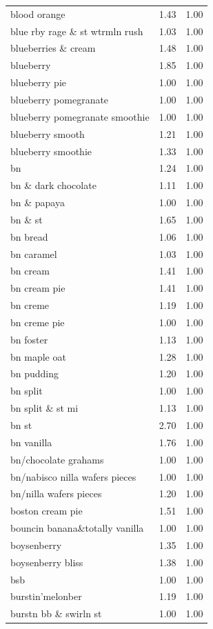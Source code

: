 \begin{table}
\begin{tabular}{lrr}
blood orange & 1.43 & 1.00 \\
blue rby rage \& st wtrmln rush & 1.03 & 1.00 \\
blueberries \& cream & 1.48 & 1.00 \\
blueberry & 1.85 & 1.00 \\
blueberry pie & 1.00 & 1.00 \\
blueberry pomegranate & 1.00 & 1.00 \\
blueberry pomegranate smoothie & 1.00 & 1.00 \\
blueberry smooth & 1.21 & 1.00 \\
blueberry smoothie & 1.33 & 1.00 \\
bn & 1.24 & 1.00 \\
bn \& dark chocolate & 1.11 & 1.00 \\
bn \& papaya & 1.00 & 1.00 \\
bn \& st & 1.65 & 1.00 \\
bn bread & 1.06 & 1.00 \\
bn caramel & 1.03 & 1.00 \\
bn cream & 1.41 & 1.00 \\
bn cream pie & 1.41 & 1.00 \\
bn creme & 1.19 & 1.00 \\
bn creme pie & 1.00 & 1.00 \\
bn foster & 1.13 & 1.00 \\
bn maple oat & 1.28 & 1.00 \\
bn pudding & 1.20 & 1.00 \\
bn split & 1.00 & 1.00 \\
bn split \& st mi & 1.13 & 1.00 \\
bn st & 2.70 & 1.00 \\
bn vanilla & 1.76 & 1.00 \\
bn/chocolate grahams & 1.00 & 1.00 \\
bn/nabisco nilla wafers pieces & 1.00 & 1.00 \\
bn/nilla wafers pieces & 1.20 & 1.00 \\
boston cream pie & 1.51 & 1.00 \\
bouncin banana\&totally vanilla & 1.00 & 1.00 \\
boysenberry & 1.35 & 1.00 \\
boysenberry bliss & 1.38 & 1.00 \\
bsb & 1.00 & 1.00 \\
burstin'melonber & 1.19 & 1.00 \\
burstn bb \& swirln st & 1.00 & 1.00 \\

\end{tabular}
\end{table}
